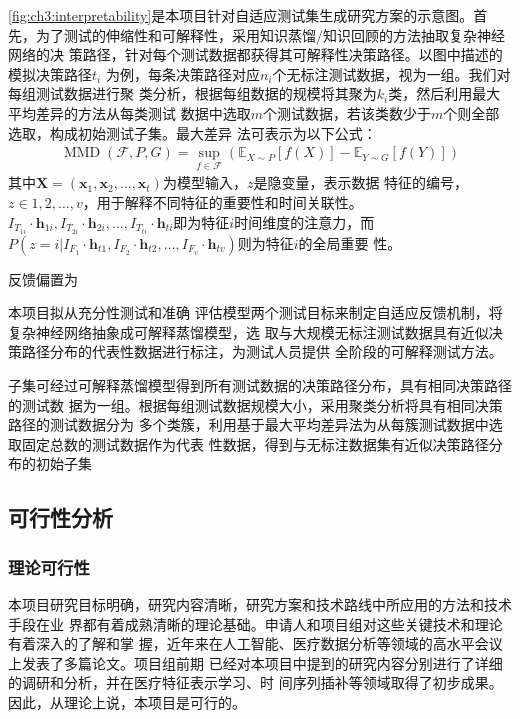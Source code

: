 \cref{fig:ch3:interpretability}是本项目针对自适应测试集生成研究方案的示意图。首
先，为了测试的伸缩性和可解释性，采用知识蒸馏/知识回顾的方法抽取复杂神经网络的决
策路径，针对每个测试数据都获得其可解释性决策路径。以图中描述的模拟决策路径$t_i$
为例，每条决策路径对应$n_i$个无标注测试数据，视为一组。我们对每组测试数据进行聚
类分析，根据每组数据的规模将其聚为$k_i$类，然后利用最大平均差异的方法从每类测试
数据中选取$m$个测试数据，若该类数少于$m$个则全部选取，构成初始测试子集。最大差异
法可表示为以下公式：
\begin{equation}
    \begin{aligned}
        \operatorname{MMD}(\mathcal{F}, P, G)=\sup _{f \in \mathcal{F}}\left(\mathbb{E}_{X \sim P}[f(X)]-\mathbb{E}_{Y \sim G}[f(Y)]\right)
    \end{aligned}
\end{equation}
其中$\bm X= (\bm x_1, \bm x_2, \dots, \bm x_t)$为模型输入，$z$是隐变量，表示数据
特征的编号，$z \in {1,2,\dots, v}$，用于解释不同特征的重要性和时间关联性。
$I_{T_{1i}} \cdot \bm h_{1i}, I_{T_{2i}} \cdot \bm h_{2i}, \dots, I_{T_{ti}}
\cdot \bm h_{ti}$即为特征$i$时间维度的注意力，而$P(z=i|I_{F_1} \cdot \bm h_{t1},
I_{F_2} \cdot \bm h_{t2}, \dots, I_{F_v} \cdot \bm h_{tv})$则为特征$i$的全局重要
性。

反馈偏置为

{本项目拟从充分性测试和准确
评估模型两个测试目标来制定自适应反馈机制，将复杂神经网络抽象成可解释蒸馏模型，选
取与大规模无标注测试数据具有近似决策路径分布的代表性数据进行标注，为测试人员提供
全阶段的可解释测试方法}。

子集可经过可解释蒸馏模型得到所有测试数据的决策路径分布，具有相同决策路径的测试数
据为一组。根据每组测试数据规模大小，采用聚类分析将具有相同决策路径的测试数据分为
多个类簇，利用基于最大平均差异法为从每簇测试数据中选取固定总数的测试数据作为代表
性数据，得到与无标注数据集有近似决策路径分布的初始子集

\subsection{可行性分析}

\subsubsection{理论可行性}

本项目研究目标明确，研究内容清晰，研究方案和技术路线中所应用的方法和技术手段在业
界都有着成熟清晰的理论基础。申请人和项目组对这些关键技术和理论有着深入的了解和掌
握，近年来在人工智能、医疗数据分析等领域的高水平会议上发表了多篇论文。项目组前期
已经对本项目中提到的研究内容分别进行了详细的调研和分析，并在医疗特征表示学习、时
间序列插补等领域取得了初步成果。因此，从理论上说，本项目是可行的。

